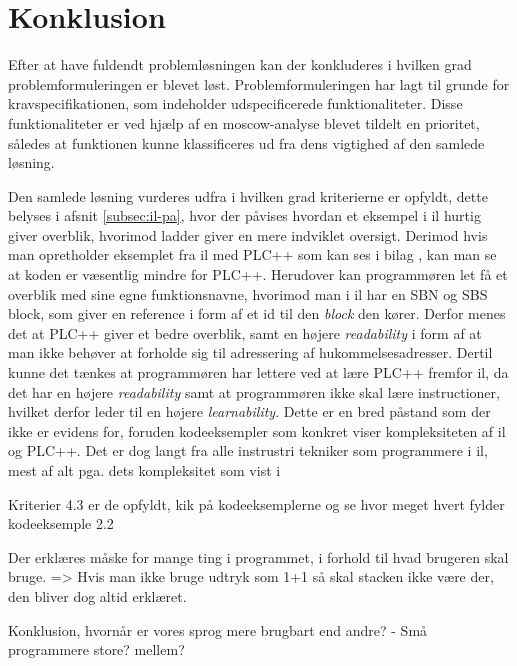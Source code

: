\chapter{Konklusion}
\label{sec:konklusion}

Efter at have fuldendt problemløsningen kan der konkluderes i hvilken grad problemformuleringen er blevet løst.
Problemformuleringen har lagt til grunde for kravspecifikationen, som indeholder udspecificerede funktionaliteter.
Disse funktionaliteter er ved hjælp af en \gls{moscow}-analyse blevet tildelt en prioritet, således at funktionen kunne klassificeres ud fra dens vigtighed af den samlede løsning.

Den samlede løsning vurderes udfra i hvilken grad kriterierne er opfyldt, dette belyses i afsnit \ref{subsec:il-pa}, hvor der påvises hvordan et eksempel i \gls{il} hurtig giver overblik, hvorimod \gls{ladder} giver en mere indviklet oversigt. Derimod hvis man opretholder eksemplet fra \gls{il} med PLC++ som kan ses i bilag \label{bil:semantik}, kan man se at koden er væsentlig mindre for PLC++.
Herudover kan programmøren let få et overblik med sine egne funktionsnavne, hvorimod man i \gls{il} har en SBN og SBS block, som giver en reference i form af et id til den \textit{block} den kører.
Derfor menes det at PLC++ giver et bedre overblik, samt en højere \textit{readability} i form af at man ikke behøver at forholde sig til adressering af hukommelsesadresser.
Dertil kunne det tænkes at programmøren har lettere ved at lære PLC++ fremfor \gls{il}, da det har en højere  \textit{readability} samt at programmøren ikke skal lære instructioner, hvilket derfor leder til en højere \textit{learnability}. Dette er en bred påstand som der ikke er evidens for, foruden kodeeksempler som konkret viser kompleksiteten af \gls{il} og PLC++.
Det er dog langt fra alle instrustri tekniker som programmere i \gls{il}, mest af alt pga. dets kompleksitet som vist i  






Kriterier 4.3 er de opfyldt, kik på kodeeksemplerne og se hvor meget hvert fylder kodeeksemple 2.2

Der erklæres måske for mange ting i programmet, i forhold til hvad brugeren skal bruge. => Hvis man ikke bruge udtryk som 1+1 så skal stacken ikke være der, den bliver dog altid erklæret.

Konklusion, hvornår er vores sprog mere brugbart end andre? - Små programmere store? mellem?

